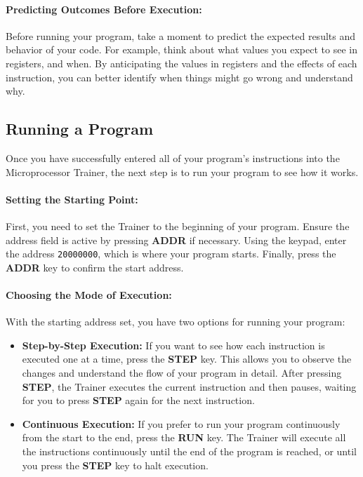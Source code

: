 \documentclass[12pt]{article}
\begin{document}
\paragraph{Predicting Outcomes Before Execution:}
Before running your program, take a moment to predict the expected results and behavior of your code. For example, think about what values you expect to see in registers, and when. By anticipating the values in registers and the effects of each instruction, you can better identify when things might go wrong and understand why.

\subsection{Running a Program}

Once you have successfully entered all of your program's instructions into the Microprocessor Trainer, the next step is to run your program to see how it works.

\paragraph{Setting the Starting Point:}
First, you need to set the Trainer to the beginning of your program. Ensure the address field is active by pressing \textbf{ADDR} if necessary. Using the keypad, enter the address \texttt{20000000}, which is where your program starts. Finally, press the \textbf{ADDR} key to confirm the start address.

\paragraph{Choosing the Mode of Execution:}
With the starting address set, you have two options for running your program:
\begin{itemize}
    \item \textbf{Step-by-Step Execution:} If you want to see how each instruction is executed one at a time, press the \textbf{STEP} key. This allows you to observe the changes and understand the flow of your program in detail. After pressing \textbf{STEP}, the Trainer executes the current instruction and then pauses, waiting for you to press \textbf{STEP} again for the next instruction.

    \item \textbf{Continuous Execution:} If you prefer to run your program continuously from the start to the end, press the \textbf{RUN} key. The Trainer will execute all the instructions continuously until the end of the program is reached, or until you press the \textbf{STEP} key to halt execution.
\end{itemize}
\end{document}
